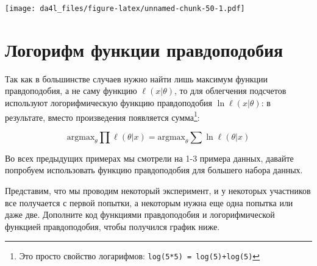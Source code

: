 \documentclass[
]{book}
\makeatletter
\newenvironment{kframe}{%
    \medskip{}
    \setlength{\fboxsep}{.8em}
    \def\at@end@of@kframe{}%
    \ifinner\ifhmode%
    \def\at@end@of@kframe{\end{minipage}}%
    \begin{minipage}{\columnwidth}%
    \fi\fi%
    \def\FrameCommand##1{\hskip\@totalleftmargin \hskip-\fboxsep
    \colorbox{shadecolor}{##1}\hskip-\fboxsep
        \hskip-\linewidth \hskip-\@totalleftmargin \hskip\columnwidth}%
    \MakeFramed {\advance\hsize-\width
      \@totalleftmargin\z@ \linewidth\hsize
      \@setminipage}}%
  {\par\unskip\endMakeFramed%
    \at@end@of@kframe}
\newenvironment{rmdblock}[1]
  {
    \begin{itemize}
    \renewcommand{\labelitemi}{
      \raisebox{-.7\height}[0pt][0pt]{
        {\setkeys{Gin}{width=3em,keepaspectratio}\texttt{[image: images/\#1]}}
        }
        }
        \setlength{\fboxsep}{1em}
        \begin{kframe}
        \item
      }
      {
        \end{kframe}
        \end{itemize}
      }
\newenvironment{rmdtask}
      {\begin{rmdblock}{task}}
      {\end{rmdblock}}
\makeatother
\begin{document}
\texttt{[image: da4l\_files/figure-latex/unnamed-chunk-50-1.pdf]}

\hypertarget{ux43bux43eux433ux43eux440ux438ux444ux43c-ux444ux443ux43dux43aux446ux438ux438-ux43fux440ux430ux432ux434ux43eux43fux43eux434ux43eux431ux438ux44f}{%
\section{Логорифм функции правдоподобия}\label{ux43bux43eux433ux43eux440ux438ux444ux43c-ux444ux443ux43dux43aux446ux438ux438-ux43fux440ux430ux432ux434ux43eux43fux43eux434ux43eux431ux438ux44f}}

Так как в большинстве случаев нужно найти лишь максимум функции правдоподобия, а не саму функцию \(\ell(x|\theta)\), то для облегчения подсчетов используют логорифмическую функцию правдоподобия \(\ln\ell(x|\theta)\): в результате, вместо произведения появляется сумма\footnote{Это просто свойство логарифмов: \texttt{log(5*5)\ =\ log(5)+log(5)}}:

\[\text{argmax}_\theta \prod \ell(\theta|x) = \text{argmax}_\theta \sum \ln\ell(\theta|x) \]

Во всех предыдущих примерах мы смотрели на 1-3 примера данных, давайте попробуем использовать функцию правдоподобия для большего набора данных.

\begin{rmdtask}
Представим, что мы проводим некоторый эксперимент, и у некоторых
участников все получается с первой попытки, а некоторым нужна еще одна
попытка или даже две. Дополните код функциями правдоподобия и
логорифмической функцией правдоподобия, чтобы получился график ниже.
\end{rmdtask}
\end{document}
